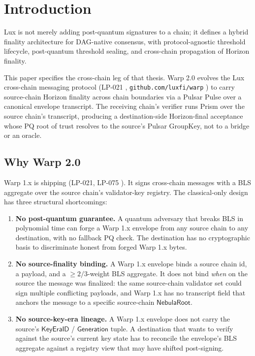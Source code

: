 \section{Introduction}
\label{sec:introduction}

Lux is not merely adding post-quantum signatures to a chain; it defines a hybrid finality architecture for DAG-native consensus, with protocol-agnostic threshold lifecycle, post-quantum threshold sealing, and cross-chain propagation of Horizon finality.

This paper specifies the cross-chain leg of that thesis. Warp 2.0 evolves the Lux cross-chain messaging protocol (LP-021 \cite{lp021}, \texttt{github.com/luxfi/warp} \cite{warpgo}) to carry source-chain Horizon finality across chain boundaries via a Pulsar Pulse over a canonical envelope transcript. The receiving chain's verifier runs Prism over the source chain's transcript, producing a destination-side Horizon-final acceptance whose PQ root of trust resolves to the source's Pulsar GroupKey, not to a bridge or an oracle.

\subsection{Why Warp 2.0}

Warp 1.x is shipping (LP-021, LP-075 \cite{lp021,lp075}). It signs cross-chain messages with a BLS aggregate over the source chain's validator-key registry. The classical-only design has three structural shortcomings:

\begin{enumerate}[leftmargin=2em,nosep]
  \item \textbf{No post-quantum guarantee.} A quantum adversary that breaks BLS in polynomial time can forge a Warp 1.x envelope from any source chain to any destination, with no fallback PQ check. The destination has no cryptographic basis to discriminate honest from forged Warp 1.x bytes.
  \item \textbf{No source-finality binding.} A Warp 1.x envelope binds a source chain id, a payload, and a $\geq 2/3$-weight BLS aggregate. It does not bind \emph{when} on the source the message was finalized: the same source-chain validator set could sign multiple conflicting payloads, and Warp 1.x has no transcript field that anchors the message to a specific source-chain $\mathsf{NebulaRoot}$.
  \item \textbf{No source-key-era lineage.} A Warp 1.x envelope does not carry the source's $\mathsf{KeyEraID}$ / $\mathsf{Generation}$ tuple. A destination that wants to verify against the source's current key state has to reconcile the envelope's BLS aggregate against a registry view that may have shifted post-signing.
\end{enumerate}

